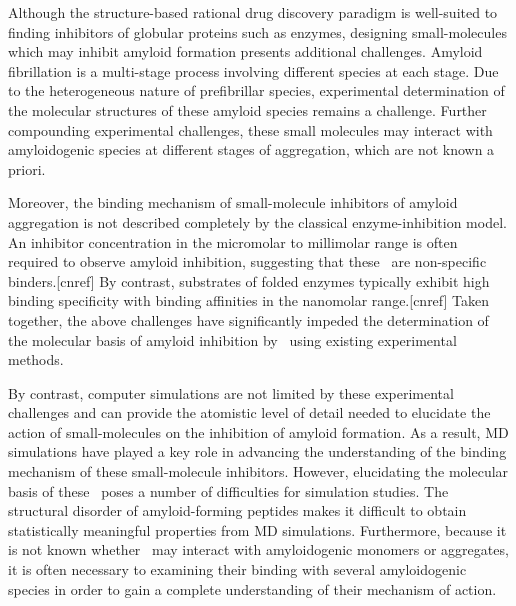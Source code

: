Although the structure-based rational drug discovery paradigm is well-suited to finding inhibitors of globular proteins such as enzymes, designing small-molecules which may inhibit amyloid formation presents additional challenges. Amyloid fibrillation is a multi-stage process involving different species at each stage.  Due to the heterogeneous nature of prefibrillar species, experimental determination of the molecular structures of these amyloid species remains a challenge.  Further compounding experimental challenges, these small molecules may interact with amyloidogenic species at different stages of aggregation, which are not known a priori. 

Moreover, the binding mechanism of small-molecule inhibitors of amyloid aggregation is not described completely by the classical enzyme-inhibition model.   An inhibitor concentration in the micromolar to millimolar range is often required to observe amyloid inhibition, suggesting that these \smis\ are non-specific binders.[cnref] By contrast, substrates of folded enzymes typically exhibit high binding specificity with binding affinities in the nanomolar range.[cnref]  Taken together, the above challenges have significantly impeded the determination of the molecular basis of amyloid inhibition by \smis\ using existing experimental methods.  

By contrast, computer simulations are not limited by these experimental challenges and can provide the atomistic level of detail needed to elucidate the action of small-molecules on the inhibition of amyloid formation.
As a result, MD simulations have played a key role in advancing the understanding of the binding mechanism of these small-molecule inhibitors. However, elucidating the molecular basis of these \smis\ poses a number of difficulties for simulation studies. The structural disorder of amyloid-forming peptides makes it difficult to obtain statistically meaningful properties from MD simulations.  Furthermore, because it is not known whether \smis\ may interact with amyloidogenic monomers or aggregates, it is often necessary to examining their binding with several amyloidogenic species in order to gain a complete understanding of their mechanism of action.

